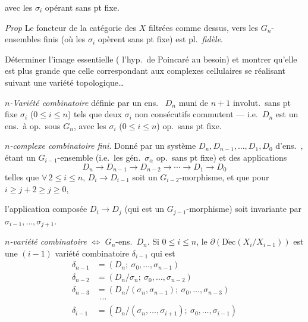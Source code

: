 \documentclass[11pt,a4paper]{article}
\begin{document}
avec les $\sigma_i$ opérant sans pt fixe.

\emph{Prop} Le foncteur de la catégorie \struck{\ill{}} des  $X$ filtrées comme dessus, vers les $G_n$-ensembles finis
(où les $\sigma_i$ opèrent sans pt fixe) est pl.\ \emph{fidèle}.

Déterminer l'image essentielle ( l'hyp.\ de Poincaré
au besoin) et montrer qu'elle est plus grande que celle correspondant aux
complexes cellulaires se réalisant suivant une variété topologique…

\emph{$n$-Variété combinatoire}  définie par un ens.\
 $D_n$ muni de $n+1$  involut.\ sans pt
fixe $\sigma_i$ ($0 \leqslant i \leqslant n$) tels que deux $\sigma_i$ non
consécutifs commutent --- i.e.\ $D_n$ est un ens.\ à op.\ sous $G_n$, avec
les $\sigma_i$ ($0 \leqslant i \leqslant n$) op.\ sans pt fixe.

\emph{$n$-complexe combinatoire} \emph{fini}. Donné par un système
$D_n, D_{n-1}, \dots, D_1, D_0$ d'ens.\ \add{finis}, 
\add{$D_i$ ($1 \leqslant i \leqslant n$)} étant un \struck{\ill{}}
$G_{i-1}$-ensemble \add{« spécial »} (i.e.\ les gén.\ $\sigma_\alpha$ op.\
sans pt fixe) et des applications
\[
  D_n \longrightarrow D_{n-1} \longrightarrow D_{n-2} \longrightarrow
  \cdots \longrightarrow D_1 \longrightarrow D_0
\]
telles que $\forall\, 2 \leqslant i \leqslant n$, $D_i \to D_{i-1}$ soit
un $G_{i-2}$-morphisme, et que pour 
$i \geqslant j+2 \geqslant j \geqslant 0$,

l'application composée $D_i \to D_j$ (qui est un $G_{j-1}$-morphisme) soit
invariante par $\sigma_{i-1}, \dots, \sigma_{j+1}$.

\emph{$n$-variété combinatoire} $\Leftrightarrow$ $G_n$-ens.\ $D_n$. Si
$0 \leqslant i \leqslant n$, le 
\struck{\ill{} décomp.} $\partial(\mathrm{D\acute{e}c}(X_i/X_{i-1}))$ est
une $(i-1)$ variété combinatoire $\delta_{i-1}$ qui est
\begin{align*}
  \delta_{n-1} &= (D_n;\ \sigma_0, \dots, \sigma_{n-1}) \\
  \delta_{n-2} &= (D_n/\sigma_n;\ \sigma_0, \dots, \sigma_{n-2}) \\
  \delta_{n-3} &= (D_n/(\sigma_n, \sigma_{n-1});\ \sigma_0, \dots,
  \sigma_{n-3}) \\
  &\ \ \cdots \\
  \delta_{i-1} &= (D_n/(\sigma_n, \dots, \sigma_{i+1});\ \sigma_0, \dots,
  \sigma_{i-1})
\end{align*}
\end{document}
